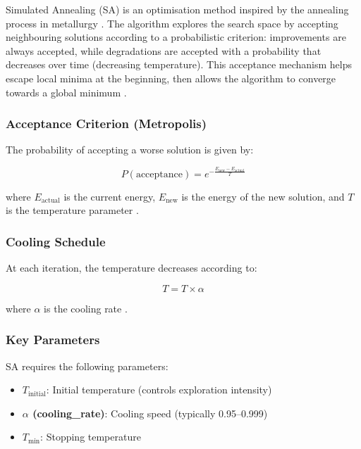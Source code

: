 Simulated Annealing (SA) is an optimisation method inspired by the annealing process in metallurgy \cite{task3_chenonceau}. The algorithm explores the search space by accepting neighbouring solutions according to a probabilistic criterion: improvements are always accepted, while degradations are accepted with a probability that decreases over time (decreasing temperature). This acceptance mechanism helps escape local minima at the beginning, then allows the algorithm to converge towards a global minimum \cite{task3_chenonceau}.

\subsubsection{Acceptance Criterion (Metropolis)}

The probability of accepting a worse solution is given by:

\begin{equation}
P(\text{acceptance}) = e^{-\frac{E_{\text{new}} - E_{\text{actual}}}{T}}
\end{equation}

where $E_{\text{actual}}$ is the current energy, $E_{\text{new}}$ is the energy of the new solution, and $T$ is the temperature parameter \cite{task3_chenonceau}.

\subsubsection{Cooling Schedule}

At each iteration, the temperature decreases according to:

\begin{equation}
T = T \times \alpha
\end{equation}

where $\alpha$ is the cooling rate \cite{task3_chenonceau}.

\subsubsection{Key Parameters}

SA requires the following parameters:
\begin{itemize}
    \item \textbf{$T_{\text{initial}}$}: Initial temperature (controls exploration intensity)
    \item \textbf{$\alpha$ (cooling\_rate)}: Cooling speed (typically 0.95--0.999)
    \item \textbf{$T_{\text{min}}$}: Stopping temperature
\end{itemize}

